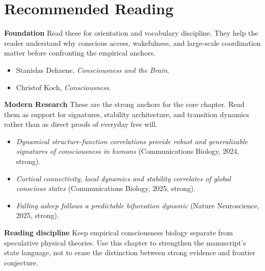 \section{Recommended Reading}

\begin{readingbox}
\textbf{Foundation} Read these for orientation and vocabulary discipline. They
help the reader understand why conscious access, wakefulness, and large-scale
coordination matter before confronting the empirical anchors.
\begin{itemize}[nosep]
  \item Stanislas Dehaene, \emph{Consciousness and the Brain}.
  \item Christof Koch, \emph{Consciousness}.
\end{itemize}
\textbf{Modern Research} These are the strong anchors for the core chapter.
Read them as support for signatures, stability architecture, and transition
dynamics rather than as direct proofs of everyday free will.
\begin{itemize}[nosep]
  \item \emph{Dynamical structure-function correlations provide robust and
        generalizable signatures of consciousness in humans}
        (Communications Biology, 2024, strong).
  \item \emph{Cortical connectivity, local dynamics and stability correlates of
        global conscious states} (Communications Biology, 2025, strong).
  \item \emph{Falling asleep follows a predictable bifurcation dynamic}
        (Nature Neuroscience, 2025, strong).
\end{itemize}
\textbf{Reading discipline} Keep empirical consciousness biology separate from
speculative physical theories. Use this chapter to strengthen the manuscript's
state language, not to erase the distinction between strong evidence and
frontier conjecture.
\end{readingbox}
